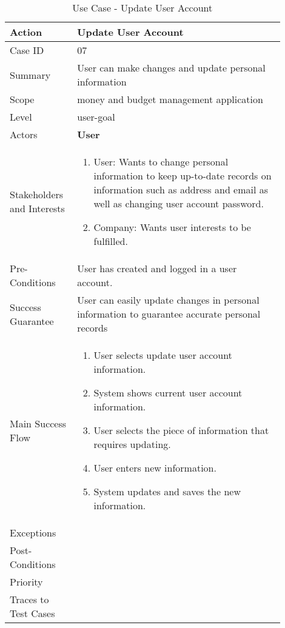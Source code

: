 \documentclass[11pt]{article}
\newcounter{use case ID}
\newcommand\tabularhead[1]{
    \begin{table}[ht]
        \addtocounter{use case ID}{1}
        \caption{Use Case \arabic{use case ID} - #1}
        \vspace{0.2cm}
        \begin{tabular}{|p{0.2\linewidth}|p{0.70\linewidth}|}
            \hline
            \textbf{Action} & \textbf{#1} \\
            \hline}
\newcommand\addrow[2]{#1 & #2\\ \hline}
\newcommand\addmulrow[2]{ \begin{minipage}[t][][t]{2.5cm}#1\end{minipage}
                &\begin{minipage}[t][][t]{11cm}
                    \begin{enumerate}[itemsep=-1ex] #2   \end{enumerate}
                \end{minipage}\vfill\\ \hline}
\newenvironment{usecase}{\tabularhead}
        {\hline\end{tabular}\end{table}}
\newcounter{req ID}
\begin{document}
\begin{usecase}{Update User Account}
    \addrow{Case ID}{07}
    \addrow{Summary}{User can make changes and update personal information}
    \addrow{Scope}{money and budget management application}
    \addrow{Level}{user-goal}
    \addrow{Actors}{\textbf{User}}
    \addmulrow{Stakeholders and Interests}{
    \item User:  Wants to change personal information to keep up-to-date records on information such as address and email as well as changing user account password.
    \item Company: Wants user interests to be fulfilled. }
    \addrow{Pre-Conditions}{User has created and logged in a user account.}
    \addrow{Success Guarantee}{User can easily update changes in personal information to guarantee accurate personal records }
    \addmulrow{Main Success Flow}{
    \item User selects update user account information.
    \item System shows current user account information.
    \item User selects the piece of information that requires updating.
    \item User enters new information.
    \item System updates and saves the new information.
    }
    \addrow{Exceptions}{}
    \addrow{Post-Conditions}{}
    \addrow{Priority}{}
    \addrow{Traces to Test Cases}{}
\end{usecase}
\end{document}
